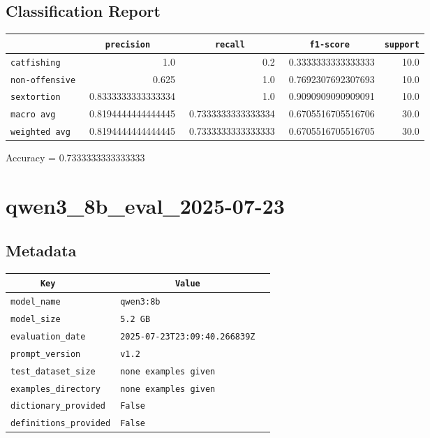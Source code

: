 \documentclass{article}
\begin{document}
\subsection{Classification Report}

\begin{center}
\begin{tabular}{l | r | r | r | r} \hline
    \verb|            | & \verb|    precision     | & \verb|      recall      | & \verb|     f1-score     | & \verb|support| \\ \hline
    \hline
    \verb|catfishing | & 1.0 & 0.2 & 0.3333333333333333 &    10.0 \\ \hline
    \verb|non-offensive| & 0.625 & 1.0 & 0.7692307692307693 &    10.0 \\ \hline
    \verb|sextortion | & 0.8333333333333334 & 1.0 & 0.9090909090909091 &    10.0 \\ \hline
    \verb|macro avg  | & 0.8194444444444445 & 0.7333333333333334 & 0.6705516705516706 &    30.0 \\ \hline
    \verb|weighted avg| & 0.8194444444444445 & 0.7333333333333333 & 0.6705516705516705 &    30.0 \\ \hline
\end{tabular}
\end{center}

\begin{center}
Accuracy = 0.7333333333333333
\end{center}

\section{qwen3\_8b\_eval\_2025-07-23}
\subsection{Metadata}

\begin{center}
\begin{tabular}{l | l} \hline
    \verb|      Key      | & \verb|           Value           | \\ \hline
    \hline
    \verb|model_name    | & \verb|qwen3:8b                     | \\ \hline
    \verb|model_size    | & \verb|5.2 GB                       | \\ \hline
    \verb|evaluation_date| & \verb|2025-07-23T23:09:40.266839Z  | \\ \hline
    \verb|prompt_version| & \verb|v1.2                         | \\ \hline
    \verb|test_dataset_size| & \verb|none examples given          | \\ \hline
    \verb|examples_directory| & \verb|none examples given          | \\ \hline
    \verb|dictionary_provided| & \verb|False                        | \\ \hline
    \verb|definitions_provided| & \verb|False                        | \\ \hline
\end{tabular}
\end{center}
\end{document}
